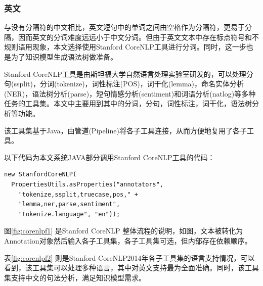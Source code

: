 \subsubsection{英文}
与没有分隔符的中文相比，英文短句中的单词之间由空格作为分隔符，更易于分隔，因而英文的分词难度远远小于中文分词。但由于英文文本中存在标点符号和不规则语用现象，本文选择使用Stanford CoreNLP工具进行分词。同时，这一步也是为了知识模型生成语法树做准备。\par
Stanford CoreNLP工具是由斯坦福大学自然语言处理实验室研发的\cite{corenlp}，可以处理分句(ssplit)，分词(tokenize)，词性标注(POS)，词干化(lemma)，命名实体分析(NER)，语法树分析(parse)，短句情感分析(sentiment)和词语分析(natlog)等多种任务的工具集。本文中主要用到其中的分词，分句，词性标注，词干化，语法树分析等功能。\par
该工具集基于Java，由管道(Pipeline)将各子工具连接，从而方便地复用了各子工具。\par
以下代码为本文系统JAVA部分调用Stanford CoreNLP工具的代码：\par
\lstset{language=java}
\begin{lstlisting}
new StanfordCoreNLP(
  PropertiesUtils.asProperties("annotators",
    "tokenize,ssplit,truecase,pos," + 
    "lemma,ner,parse,sentiment",
    "tokenize.language", "en"));
\end{lstlisting}

图\ref{fig:corenlpf1} \cite{corenlp} 是Stanford CoreNLP 整体流程的说明，如图，文本被转化为Annotation对象然后输入各子工具集，各子工具集可选，但内部存在依赖顺序。\par
表\ref{fig:corenlpf2} \cite{corenlp} 则是Stanford CoreNLP2014年各子工具集的语言支持情况，可以看到，该工具集可以处理多种语言，其中对英文支持最为全面准确。同时，该工具集支持中文的句法分析，满足知识模型需求。
\begin{center}
\begin{figure}
\end{figure}
\end{center}

